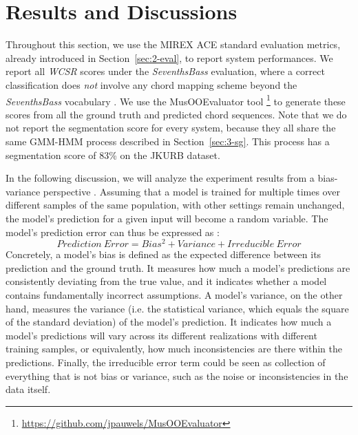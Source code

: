 
\section{Results and Discussions} \label{sec:3-res}
Throughout this section, we use the MIREX ACE standard evaluation metrics, already introduced in Section~\ref{sec:2-eval}, to report system performances. We report all \textit{WCSR} scores under the \textit{SeventhsBass} evaluation, where a correct classification does {\it not} involve any chord mapping scheme beyond the \textit{SeventhsBass} vocabulary \cite{pauwels2013evaluating}. We use the MusOOEvaluator tool \footnote{\url{https://github.com/jpauwels/MusOOEvaluator}} to generate these scores from all the ground truth and predicted chord sequences. Note that we do not report the segmentation score for every system, because they all share the same GMM-HMM process described in Section~\ref{sec:3-sg}. This process has a segmentation score of 83\% on the JKURB dataset.

In the following discussion, we will analyze the experiment results from a bias-variance perspective \cite{geman1992neural}. Assuming that a model is trained for multiple times over different samples of the same population, with other settings remain unchanged, the model's prediction for a given input will become a random variable. The model's prediction error can thus be expressed as \cite{friedman2001elements}:
\begin{equation}
Prediction\ Error = Bias^2 + Variance + Irreducible\ Error
\end{equation}
Concretely, a model's bias is defined as the expected difference between its prediction and the ground truth. It measures how much a model's predictions are consistently deviating from the true value, and it indicates whether a model contains fundamentally incorrect assumptions. A model's variance, on the other hand, measures the variance (i.e. the statistical variance, which equals the square of the standard deviation) of the model's prediction. It indicates how much a model's predictions will vary across its different realizations with different training samples, or equivalently, how much inconsistencies are there within the predictions. Finally, the irreducible error term could be seen as collection of everything that is not bias or variance, such as the noise or inconsistencies in the data itself.

